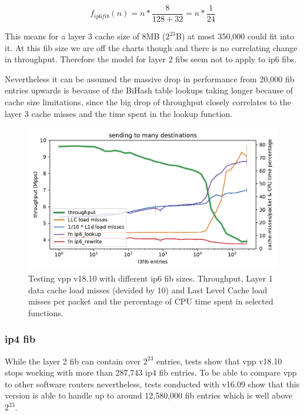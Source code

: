 $$ f_{ip6fib}(n) = n * \frac{8}{128 + 32} = n * \frac{1}{24}  $$

This means for a layer 3 cache size of 8MB ($2^{23}$B) at most 350,000
could fit into it. At this \Ac{fib} size we are off the charts though
and there is no correlating change in throughput. Therefore the model
for layer 2 \Ac{fib}s seem not to apply to \Ac{ip6} \Ac{fib}s.



Nevertheless it can be assumed the massive drop in performance
from 20,000 \Ac{fib} entries upwards is because of the BiHash table lookups taking longer because of cache size limitations, since the big drop of throughput closely correlates to the layer 3 cache misses and the time spent in the lookup function. 


\begin{figure}[!ht]
\noindent\hspace{0.5mm}\includegraphics[width=\linewidth]{pics/throughput_l3v6_routes_klaipeda32ghz_v2.pdf}
\caption{Testing \Ac{vpp} v18.10 with different \Ac{ip6} \Ac{fib} sizes. Throughput, Layer 1 data cache load misses (devided by 10) and Last Level Cache load misses per packet and the percentage of CPU time spent in selected functions. }
\label{graph:ip6fib}
\end{figure}




\subsubsection{\Ac{ip4} \Ac{fib}}
\label{sec:ip4fib}

While the layer 2 \Ac{fib} can contain over $2^{23}$ entries, tests
show that \Ac{vpp} v18.10 stops working with more than 287,743
\Ac{ip4} \Ac{fib} entries. To be able to compare \Ac{vpp} to other
software routers nevertheless, tests conducted with v16.09 show that
this version is able to handle up to around 12,580,000 \Ac{fib}
entries which is well above $2^{23}$.

